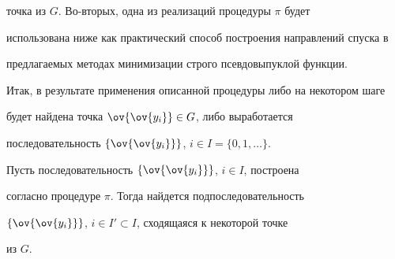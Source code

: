 точка из $G$. Во-вторых, одна из реализаций процедуры $\pi$ будет


использована ниже как практический способ построения направлений спуска в


предлагаемых методах минимизации строго псевдовыпуклой функции.





Итак, в результате применения описанной процедуры либо на некотором шаге


будет найдена точка $\ov{\ov{y_i}}\in G$, либо выработается


последовательность $\{ \ov{\ov{y_i}}\}$, $i\in I=\{0,1,\dotsc\}$.








\begin{lem}\label{l1}


Пусть последовательность $\{ \ov{\ov{y_i}}\}$, $i\in I$, построена


согласно процедуре $\pi$. Тогда найдется подпоследовательность


$\{ \ov{\ov{y_i}}\}$, $i\in I' \subset I$, сходящаяся к некоторой точке


из $G$.


\end{lem}





